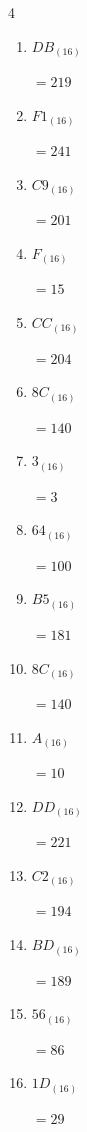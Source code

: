 \begin{multicols}{4}
\begin{enumerate}
        $=245$

  \item $DB_{(16)}$

        $=219$

  \item $F1_{(16)}$

        $=241$

  \item $C9_{(16)}$

        $=201$

  \item $F_{(16)}$

        $=15$

  \item $CC_{(16)}$

        $=204$

  \item $8C_{(16)}$

        $=140$

  \item $3_{(16)}$

        $=3$

  \item $64_{(16)}$

        $=100$

  \item $B5_{(16)}$

        $=181$

  \item $8C_{(16)}$

        $=140$

  \item $A_{(16)}$

        $=10$

\columnbreak %

  \item $DD_{(16)}$

        $=221$

  \item $C2_{(16)}$

        $=194$

  \item $BD_{(16)}$

        $=189$

  \item $56_{(16)}$

        $=86$

  \item $1D_{(16)}$

        $=29$


\end{enumerate}
\end{multicols}
